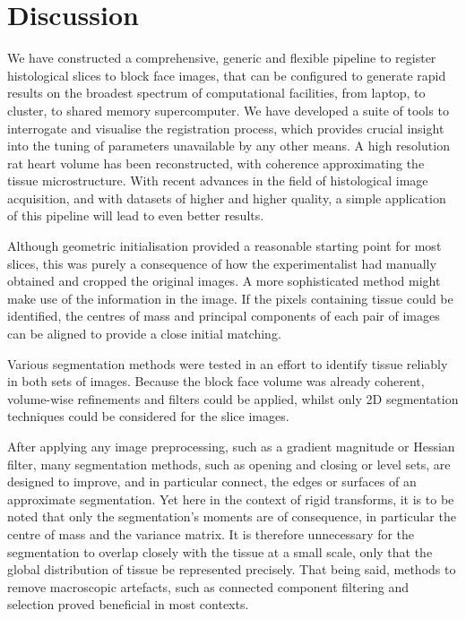\section{Discussion} %
\label{sec:discussion}
  We have constructed a comprehensive, generic and flexible pipeline to register histological slices to block face images, that can be configured to generate rapid results on the broadest spectrum of computational facilities, from laptop, to cluster, to shared memory supercomputer. We have developed a suite of tools to interrogate and visualise the registration process, which provides crucial insight into the tuning of parameters unavailable by any other means. A high resolution rat heart volume has been reconstructed, with coherence approximating the tissue microstructure. With recent advances in the field of histological image acquisition, and with datasets of higher and higher quality, a simple application of this pipeline will lead to even better results.
  
	Although geometric initialisation provided a reasonable starting point for most slices, this was purely a consequence of how the experimentalist had manually obtained and cropped the original images. A more sophisticated method might make use of the information in the image. If the pixels containing tissue could be identified, the centres of mass and principal components of each pair of images can be aligned to provide a close initial matching.

  Various segmentation methods were tested in an effort to identify tissue reliably in both sets of images. Because the block face volume was already coherent, volume-wise refinements and filters could be applied, whilst only 2D segmentation techniques could be considered for the slice images.
	
	After applying any image preprocessing, such as a gradient magnitude or Hessian filter, many segmentation methods, such as opening and closing or level sets, are designed to improve, and in particular connect, the edges or surfaces of an approximate segmentation. Yet here in the context of rigid transforms, it is to be noted that only the segmentation's moments are of consequence, in particular the centre of mass and the variance matrix. It is therefore unnecessary for the segmentation to overlap closely with the tissue at a small scale, only that the global distribution of tissue be represented precisely. That being said, methods to remove macroscopic artefacts, such as connected component filtering and selection proved beneficial in most contexts.
	
